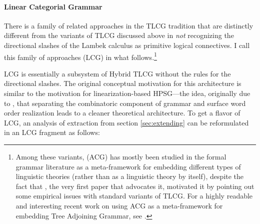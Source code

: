 \documentclass[output=paper]{langsci/langscibook}
\begin{document}
\paragraph{Linear Categorial Grammar \label{linear}}

There is a family of related approaches in the TLCG tradition
\citep{oehrle1994,degroote01,muskens03,mihalicek-pollard10,pollard13} that
are distinctly different from the variants of TLCG discussed above in
\emph{not} recognizing the directional slashes of the Lambek calculus as
primitive logical connectives. I call this family of approaches
 (LCG) in what follows.\footnote{Among
these variants,  (ACG) has mostly been studied
in the formal grammar literature as a meta-framework for embedding
different types of linguistic theories (rather than as a linguistic
theory by itself), despite the fact that \citet{degroote01}, the very first
paper that advocates it, motivated it by pointing out some empirical
issues with standard variants of TLCG. For a highly readable and
interesting recent work on
using ACG as a meta-framework for embedding Tree Adjoining Grammar,
see \citet{Pogodalla2017}.}

LCG is essentially a subsystem of Hybrid TLCG without the rules for the
directional slashes. The original conceptual motivation for this
architecture is similar to the motivation for linearization-based
HPSG---the idea, originally due to \citet{curry61}, that separating the
combinatoric component of grammar and surface word order realization
leads to a cleaner theoretical architecture. To get a flavor of LCG,
an analysis of extraction from section \ref{sec:extending} can be
reformulated in an LCG fragment as follows:
\end{document}
